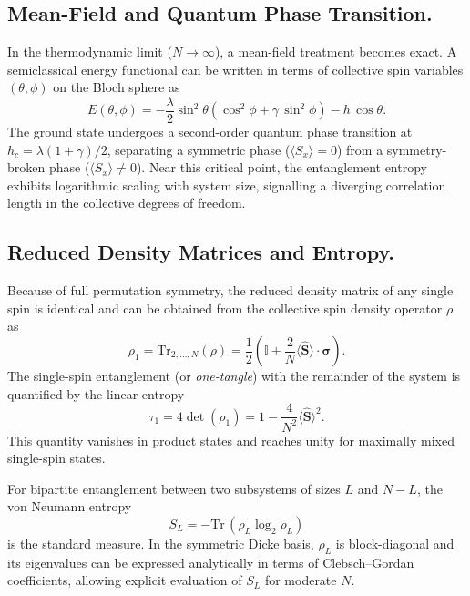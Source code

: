 \documentclass[twocolumn,superscriptaddress,unsortedaddress,nofootinbib,amsmath,amssymb,
aps,floatfix]{revtex4-2}
\begin{document}
\subsection{Mean-Field and Quantum Phase Transition.}
In the thermodynamic limit ($N \to \infty$), a mean-field treatment becomes exact.
A semiclassical energy functional can be written in terms of collective spin variables
$(\theta, \phi)$ on the Bloch sphere as
\begin{equation}
  E(\theta, \phi) = -\frac{\lambda}{2}\sin^2\theta \left( \cos^2\phi + \gamma\, \sin^2\phi \right)
  - h\, \cos\theta.
\end{equation}
The ground state undergoes a second-order quantum phase transition at $h_c = \lambda(1+\gamma)/2$,
separating a symmetric phase ($\langle S_x \rangle = 0$) from a symmetry-broken phase ($\langle S_x \rangle \neq 0$).
Near this critical point, the entanglement entropy exhibits logarithmic scaling with system size, signalling a diverging correlation length in the collective degrees of freedom.

\subsection{Reduced Density Matrices and Entropy.}
Because of full permutation symmetry, the reduced density matrix of any single spin
is identical and can be obtained from the collective spin density operator $\rho$ as
\begin{equation}
  \rho_1 = \mathrm{Tr}_{2,\ldots,N}(\rho)
  = \frac{1}{2}\left( \mathbb{I} + \frac{2}{N}\langle \hat{\mathbf{S}} \rangle \cdot \boldsymbol{\sigma} \right).
\end{equation}
The single-spin entanglement (or \emph{one-tangle}) with the remainder of the system is quantified by the linear entropy
\begin{equation}
  \tau_1 = 4 \det(\rho_1) = 1 - \frac{4}{N^2} \langle \hat{\mathbf{S}} \rangle^2.
\end{equation}
This quantity vanishes in product states and reaches unity for maximally mixed single-spin states.

For bipartite entanglement between two subsystems of sizes $L$ and $N-L$, the von Neumann entropy
\begin{equation}
  S_L = - \mathrm{Tr}\, (\rho_L \log_2 \rho_L)
\end{equation}
is the standard measure.  In the symmetric Dicke basis, $\rho_L$ is block-diagonal and
its eigenvalues can be expressed analytically in terms of Clebsch--Gordan coefficients,
allowing explicit evaluation of $S_L$ for moderate $N$.
\end{document}
